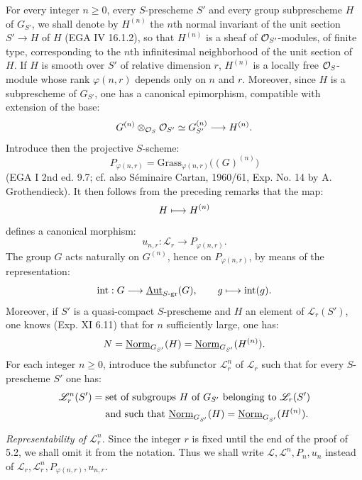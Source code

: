 For every integer $n\geq0$, every $S$-prescheme $S'$ and every group subprescheme $H$ of $G_{S'}$, we shall denote by $H^{(n)}$ the $n$th normal invariant of the unit section $S'\to H$ of $H$ (EGA IV 16.1.2), so that $H^{(n)}$ is a sheaf of $\mathcal{O}_{S'}$-modules, of finite type, corresponding to the $n$th infinitesimal neighborhood of the unit section of $H$. If $H$ is smooth over $S'$ of relative dimension $r$, $H^{(n)}$ is a locally free $\mathcal{O}_S$-module whose rank $\varphi(n,r)$ depends only on $n$ and $r$. Moreover, since $H$ is a subprescheme of $G_{S'}$, one has a canonical epimorphism, compatible with extension of the base:
\[
G^{(n)}\otimes_{\mathcal{O}_S}\mathcal{O}_{S'}\simeq G_{S'}^{(n)}\longrightarrow H^{(n)}.
\]
Introduce then the projective $S$-scheme:
\[
P_{\varphi(n,r)}=\mathrm{Grass}_{\varphi(n,r)}\bigl((G)^{(n)}\bigr)
\]
(EGA I 2nd ed. 9.7; cf. also S\'eminaire Cartan, 1960/61, Exp. No. 14 by A. Grothendieck). It then follows from the preceding remarks that the map:
\[
H\longmapsto H^{(n)}
\]
defines a canonical morphism:
\[
u_{n,r}:\mathscr L_r\to P_{\varphi(n,r)}.
\]
The group $G$ acts naturally on $G^{(n)}$, hence on $P_{\varphi(n,r)}$, by means of the representation:
\[
\mathrm{int}:G\longrightarrow\underline{\operatorname{Aut}}_{S\text{-gr}}(G),\qquad g\longmapsto\mathrm{int}(g).
\]
Moreover, if $S'$ is a quasi-compact $S$-prescheme and $H$ an element of $\mathscr L_r(S')$, one knows (Exp. XI 6.11) that for $n$ sufficiently large, one has:
\[
N=\underline{\mathrm{Norm}}_{G_{S'}}(H)=\underline{\mathrm{Norm}}_{G_{S'}}(H^{(n)}).
\]
For each integer $n\geq0$, introduce the subfunctor $\mathscr L_r^n$ of $\mathscr L_r$ such that for every $S$-prescheme $S'$ one has:
\[
\begin{aligned}
\mathscr L_r^n(S')={}&\text{set of subgroups }H\text{ of }G_{S'}\text{ belonging to }\mathscr L_r(S')\\
&\text{and such that }\underline{\mathrm{Norm}}_{G_{S'}}(H)=\underline{\mathrm{Norm}}_{G_{S'}}(H^{(n)}).
\end{aligned}
\]
\par\noindent\emph{Representability of $\mathscr L_r^n$.}
Since the integer $r$ is fixed until the end of the proof of 5.2, we shall omit it from the notation. Thus we shall write $\mathscr L,\mathscr L^n,P_n,u_n$ instead of $\mathscr L_r,\mathscr L_r^n,P_{\varphi(n,r)},u_{n,r}$.

